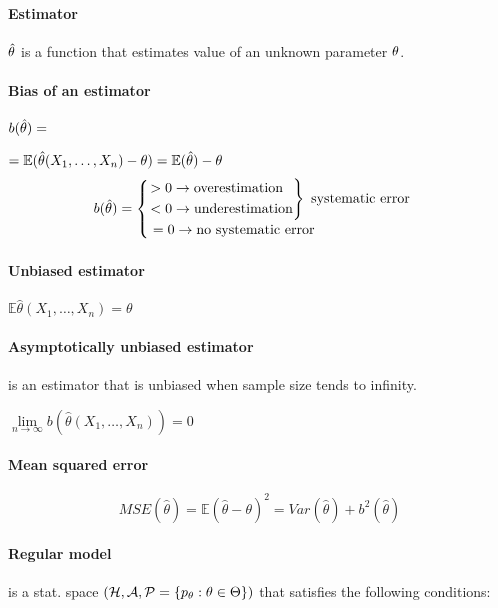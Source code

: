 \paragraph{Estimator} $\hat{\theta}$ is a function that estimates value of an unknown parameter $\theta$.

\paragraph{Bias of an estimator}
$ b(\hat{\theta}) = $

$ = \mathbb{E}(\hat{\theta}(X_{1}, \ldots, X_{n})-\theta) = \mathbb{E}(\hat{\theta})-\theta $
\begin{equation*}
b(\hat{\theta}) = \begin{cases}
\left.\begin{aligned}
   > 0 \rightarrow \mbox{overestimation} \hspace{7pt} \\
   < 0 \rightarrow \mbox{underestimation} 
\end{aligned}
\right\} \mbox{ systematic error} \\
\hspace{3pt} = 0 \rightarrow \mbox{no systematic error} 
\end{cases}
\end{equation*}

\paragraph{Unbiased estimator}
$ \mathbb{E} \hat\theta(X_1, \ldots, X_n) = \theta $

\paragraph{Asymptotically unbiased estimator}
is an estimator that is unbiased when sample size tends to infinity.

$ \underset{n \rightarrow \infty}{\lim} b(\hat{\theta}(X_1, \ldots, X_n)) = 0 $

\paragraph{Mean squared error}
\[ MSE(\hat{\theta}) = \mathbb{E}(\hat{\theta}-\theta)^2 
= Var(\hat{\theta})+b^2(\hat{\theta}) \]

\paragraph{Regular model} is a stat. space $ \left( \mathcal{H}, \mathcal{A}, \mathcal{P} = \left\{ p_\theta : \theta \in \Theta \right\} \right) $ that satisfies the following conditions:


